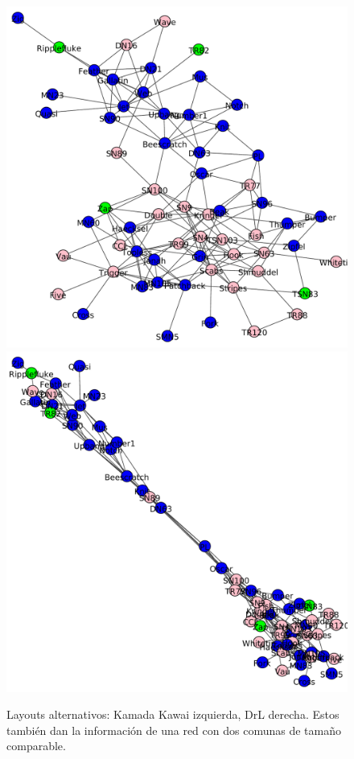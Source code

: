 \begin{figure}
\centering
\includegraphics[scale = 0.25]{figuras/KamKaw-eps-converted-to.pdf}
\includegraphics[scale = 0.25]{figuras/Drl-eps-converted-to.pdf}
\caption{Layouts alternativos: Kamada Kawai izquierda, DrL derecha. Estos también dan la información de una red con dos comunas de tamaño comparable.}
\label{fig:Layouts_alternativos}
\end{figure}

